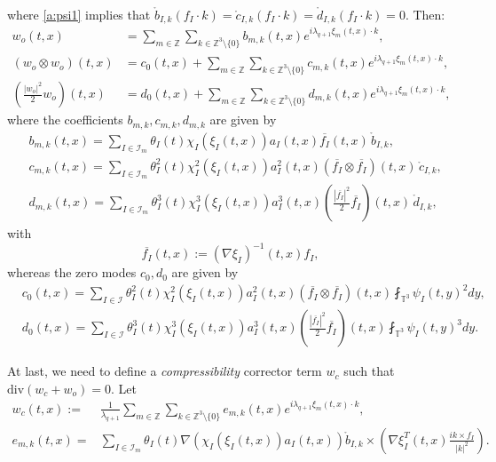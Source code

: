 \documentclass[10pt,a4paper]{amsart}
\numberwithin{equation}{section}
\numberwithin{corollario}{section}
\numberwithin{lemma}{section}
\numberwithin{prop}{section}
\theoremstyle{definition}
\theoremstyle{remark}
\newcommand{\Z}{\mathbb{Z}}
\newcommand{\T}{\mathbb{T}}
\newcommand{\qq}{_{q+1}}
\begin{document}
where \eqref{a:psi1} implies that $\mathring{b}_{I,k}(f_I\cdot k)=\mathring{c}_{I,k}(f_I\cdot k)=\mathring{d}_{I,k}(f_I\cdot k)=0$. Then:
\begin{align}
    \label{e:w0Fou} 
    w_o(t,x)
    &=
    \sum_{m\in\Z}\sum_{k\in \Z^3\setminus\{0\}}b_{m,k}(t,x)e^{i\lambda\qq \xi_m(t,x)\cdot k},
    \\
    \label{e:w0w0}
    (w_o\otimes w_o)(t,x)
    &=
    c_0(t,x)+\sum_{m\in\Z}\sum_{k\in \Z^3\setminus\{0\}}c_{m,k}(t,x)e^{i\lambda\qq \xi_m(t,x)\cdot k},
    \\
    \label{e:w03}
    \left( \frac{|w_o|^2}{2}w_o \right) (t,x)
    &=
    d_0(t,x)+\sum_{m\in\Z}\sum_{k\in \Z^3\setminus\{0\}}d_{m,k}(t,x)e^{i\lambda\qq \xi_m(t,x)\cdot k},
\end{align}
where the coefficients $b_{m,k}, c_{m,k}, d_{m,k}$ are given by
\begin{align}
&\label{e:b_mk}
b_{m,k}(t,x)=\sum_{I\in \mathcal{I}_m}\theta_I(t)\chi_I(\xi_I(t,x))a_I(t,x)\overline{f_I}(t,x)\,\mathring{b}_{I,k},
\\
&\label{e:c_mk}
c_{m,k}(t,x)=\sum_{I\in \mathcal{I}_m}\theta^2_I(t)\chi^2_I(\xi_I(t,x))a_I^2(t,x)\left(\overline{f_I}\otimes \overline{f_I}\right)(t,x)\,\mathring{c}_{I,k},
\\
&\label{e:d_mk}
d_{m,k}(t,x)=\sum_{I\in \mathcal{I}_m}\theta^3_I(t)\chi^3_I(\xi_I(t,x))a_I^3(t,x)\left(\frac{|\overline{f_I}|^2}2\overline{f_I}\right)(t,x)\,\mathring{d}_{I,k},
\end{align}
with
\begin{equation} \label{def:bar_f_I}
    \overline{f_I}(t,x):=(\nabla\xi_I)^{-1}(t,x)f_I,
\end{equation}
whereas the zero modes $c_0,d_0$ are given by
\begin{align}
&\label{e:c0}
c_0(t,x)=\sum_{I\in \mathcal{I}}\theta^2_I(t)\chi_I^2(\xi_I(t,x))a_I^2(t,x)\left(\overline{f_I}\otimes \overline{f_I}\right)(t,x) \fint_{\T^3}\psi_I(t,y)^2dy,
\\
&\label{e:d0}
d_0(t,x)=\sum_{I\in \mathcal{I}}\theta^3_I(t)\chi_I^3(\xi_I(t,x))a_I^3(t,x)\left(\frac{|\overline{f_I}|^2}2\overline{f_I}\right)(t,x) \fint_{\T^3}\psi_I(t,y)^3dy.
\end{align}

At last, we need to define a \emph{compressibility} corrector term $w_c$ such that $\text{div}(w_c+w_o)=0$. Let
\begin{align}
\label{e:wc}
w_c(t,x)
:=&
\frac1{\lambda\qq}\sum_{m\in\Z}\sum_{k\in \Z^3\setminus\{0\}}e_{m,k}(t,x)e^{i\lambda\qq \xi_m(t,x)\cdot k},
\\
\label{e:e_mk}
e_{m,k}(t,x)=&\sum_{I\in \mathcal{I}_m}\theta_I(t)\nabla\left(\chi_I(\xi_I(t,x))a_I(t,x)\right)\mathring{b}_{I,k}\times\left(\nabla\xi_I^T(t,x)\frac{ik\times f_I}{|k|^2}\right).
\end{align}
\end{document}
